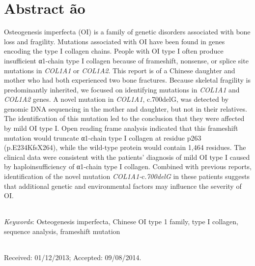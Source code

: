 \port
\section*{Abstract ão}
\par Osteogenesis imperfecta (OI) is a family of genetic disorders associated with
                    bone loss and fragility. Mutations associated with OI have been found in genes
                    encoding the type I collagen chains. People with OI type I often produce
                    insufficient α1-chain type I collagen because of frameshift, nonsense, or splice
                    site mutations in \textit{COL1A1} or \textit{COL1A2}. This
                    report is of a Chinese daughter and mother who had both experienced two bone
                    fractures. Because skeletal fragility is predominantly inherited, we focused on
                    identifying mutations in \textit{COL1A1} and \textit{COL1A2}
                    genes. A novel mutation in \textit{COL1A1}, c.700delG, was detected by
                    genomic DNA sequencing in the mother and daughter, but not in their relatives.
                    The identification of this mutation led to the conclusion that they were
                    affected by mild OI type I. Open reading frame analysis indicated that this
                    frameshift mutation would truncate α1-chain type I collagen at residue p263
                    (p.E234KfsX264), while the wild-type protein would contain 1,464 residues. The
                    clinical data were consistent with the patients’ diagnosis of mild OI type I
                    caused by haploinsufficiency of α1-chain type I collagen. Combined with previous
                    reports, identification of the novel mutation
                        \textit{COL1A1-}c.\textit{700delG} in these patients
                    suggests that additional genetic and environmental factors may influence the
                    severity of OI.

\par \noindent \\
\textit{Keywords}: Osteogenesis imperfecta, Chinese OI type 1 family, type I collagen, sequence analysis, frameshift mutation
\par \noindent \\
Received: 01/12/2013; Accepted: 09/08/2014.\par \noindent \\
